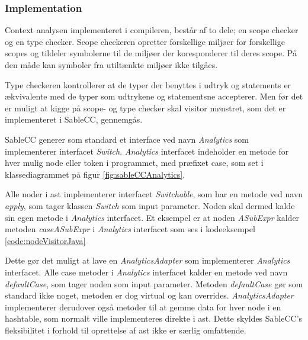 \subsubsection{Implementation}
\label{ssec:contextimple}
Context analysen implementeret i compileren, består af to dele; en scope checker og en type checker. Scope checkeren opretter forskellige miljøer for forskellige scopes og tildeler symbolerne til de miljøer der koresponderer til deres scope. På den måde kan symboler fra utiltænkte miljøer ikke tilgåes.

Type checkeren kontrollerer at de typer der benyttes i udtryk og statements er ækvivalente med de typer som udtrykene og statementsne accepterer. Men før det er muligt at kigge på scope- og type checker skal visitor mønstret, som det er implementeret i SableCC, gennemgås.

\label{sct:visitorSableCC}
SableCC generer som standard et interface ved navn \textit{Analytics} som implementerer interfacet \textit{Switch}. \textit{Analytics} interfacet indeholder en metode for hver mulig node eller token i programmet, med præfixet case, som set i klassediagrammet på figur \ref{fig:sableCCAnalytics}.

 Alle noder i \gls{ast} implementerer interfacet \textit{Switchable}, som har en metode ved navn \textit{apply}, som tager klassen \textit{Switch} som input parameter. Noden skal dermed kalde sin egen metode i \textit{Analytics} interfacet. Et eksempel er at noden \textit{ASubExpr} kalder metoden \textit{caseASubExpr} i \textit{Analytics} interfacet som ses i kodeeksempel \ref{code:nodeVisitorJava}


\noindent Dette gør det muligt at lave en \textit{AnalyticsAdapter} som implementerer \textit{Analytics} interfacet. Alle case metoder i \textit{Analytics} interfacet kalder en metode ved navn \textit{defaultCase}, som tager noden som input parameter. Metoden \textit{defaultCase} gør som standard ikke noget, metoden er dog virtual og kan overrides. \textit{AnalyticsAdapter} implementerer derudover også metoder til at gemme data for hver node i en hashtable, som normalt ville implementeres direkte i \gls{ast}. Dette skyldes SableCC's fleksibilitet i forhold til oprettelse af \gls{ast} ikke er særlig omfattende.



